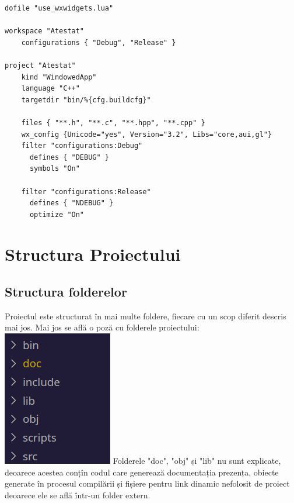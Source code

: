 \documentclass[12pt, twoside]{article}
\begin{document}
\begin{lstlisting}[language={[5.0]Lua},breaklines,frame={single}]
dofile "use_wxwidgets.lua"

workspace "Atestat"
    configurations { "Debug", "Release" }

project "Atestat"
    kind "WindowedApp"
    language "C++"
    targetdir "bin/%{cfg.buildcfg}"

    files { "**.h", "**.c", "**.hpp", "**.cpp" }
    wx_config {Unicode="yes", Version="3.2", Libs="core,aui,gl"}
    filter "configurations:Debug"
      defines { "DEBUG" }
      symbols "On"

    filter "configurations:Release"
      defines { "NDEBUG" }
      optimize "On"
\end{lstlisting}

\section{Structura Proiectului}
\subsection{Structura folderelor}
Proiectul este structurat în mai multe foldere, fiecare
cu un scop diferit descris mai jos. Mai jos se află o poză
cu folderele proiectului:
\newline
\includegraphics{folders.png}
\newline
Folderele "doc", "obj" și "lib" nu sunt explicate, deoarece
acestea conțîn codul care generează documentația prezența,
obiecte generate în procesul compilării și fișiere pentru 
link dinamic nefolosit de proiect deoarece ele se află
într-un folder extern.
\end{document}
